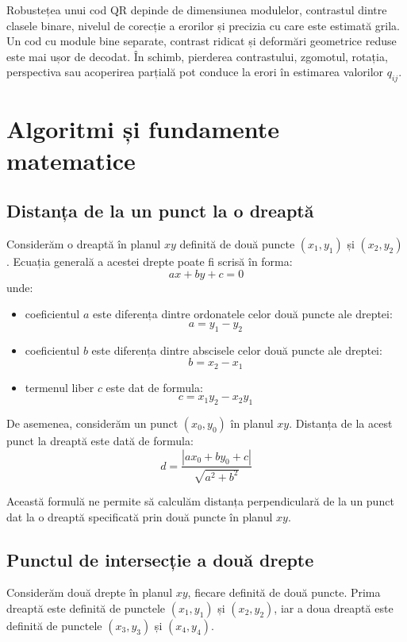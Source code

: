 Robustețea unui cod QR depinde de dimensiunea modulelor, contrastul dintre clasele binare, nivelul de corecție a erorilor și precizia cu care este estimată grila. Un cod cu module bine separate, contrast ridicat și deformări geometrice reduse este mai ușor de decodat. În schimb, pierderea contrastului, zgomotul, rotația, perspectiva sau acoperirea parțială pot conduce la erori în estimarea valorilor \(q_{ij}\).

\section{Algoritmi și fundamente matematice}

\subsection*{Distanța de la un punct la o dreaptă}

Considerăm o dreaptă în planul $xy$ definită de două puncte $(x_1, y_1)$ și $(x_2, y_2)$. Ecuația generală a acestei drepte poate fi scrisă în forma:
\[
    ax + by + c = 0
\]
unde:
\begin{itemize}
    \item coeficientul $a$ este diferența dintre ordonatele celor două puncte ale dreptei:
          \[
              a = y_1 - y_2
          \]
    \item coeficientul $b$ este diferența dintre abscisele celor două puncte ale dreptei:
          \[
              b = x_2 - x_1
          \]
    \item termenul liber $c$ este dat de formula:
          \[
              c = x_1 y_2 - x_2 y_1
          \]
\end{itemize}

De asemenea, considerăm un punct $(x_0, y_0)$ în planul $xy$. Distanța de la acest punct la dreaptă este dată de formula:
\[
    d = \frac{|a x_0 + b y_0 + c|}{\sqrt{a^2 + b^2}}
\]

Această formulă ne permite să calculăm distanța perpendiculară de la un punct dat la o dreaptă specificată prin două puncte în planul $xy$.

\subsection*{Punctul de intersecție a două drepte}


Considerăm două drepte în planul $xy$, fiecare definită de două puncte. Prima dreaptă este definită de punctele $(x_1, y_1)$ și $(x_2, y_2)$, iar a doua dreaptă este definită de punctele $(x_3, y_3)$ și $(x_4, y_4)$.

